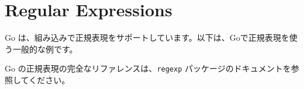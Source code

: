 \section{Regular Expressions}

Go は、組み込みで正規表現をサポートしています。以下は、Goで正規表現を使う一般的な例です。




Go の正規表現の完全なリファレンスは、\texttt{regexp} パッケージのドキュメントを参照してください。